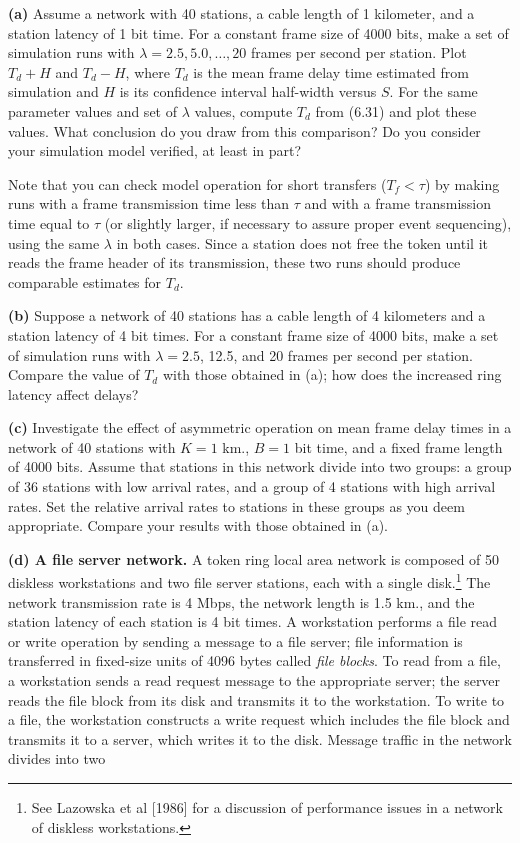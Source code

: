 \noindent\textbf{(a)} Assume a network with 40 stations, a cable length of 1 kilometer, and a station latency of 1 bit time. For a constant frame size of 4000 bits, make a set of simulation runs with $\lambda=2.5,5.0,\ldots,20$ frames per second per station. Plot $T_d+H$ and $T_d-H$, where $T_d$ is the mean frame delay time estimated from simulation and $H$ is its confidence interval half-width versus $S$. For the same parameter values and set of $\lambda$ values, compute $T_d$ from (6.31) and plot these values. What conclusion do you draw from this comparison? Do you consider your simulation model verified, at least in part?

Note that you can check model operation for short transfers ($T_f<\tau$) by making runs with a frame transmission time less than $\tau$ and with a frame transmission time equal to $\tau$ (or slightly larger, if necessary to assure proper event sequencing), using the same $\lambda$ in both cases. Since a station does not free the token until it reads the frame header of its transmission, these two runs should produce comparable estimates for $T_d$.

\noindent\textbf{(b)} Suppose a network of 40 stations has a cable length of 4 kilometers and a station latency of 4 bit times. For a constant frame size of 4000 bits, make a set of simulation runs with $\lambda=2.5$, 12.5, and 20 frames per second per station. Compare the value of $T_d$ with those obtained in (a); how does the increased ring latency affect delays?

\noindent\textbf{(c)} Investigate the effect of asymmetric operation on mean frame delay times in a network of 40 stations with $K=1$ km., $B=1$ bit time, and a fixed frame length of 4000 bits. Assume that stations in this network divide into two groups: a group of 36 stations with low arrival rates, and a group of 4 stations with high arrival rates. Set the relative arrival rates to stations in these groups as you deem appropriate. Compare your results with those obtained in (a).

\noindent\textbf{(d) A file server network.} A token ring local area network is composed of 50 diskless workstations and two file server stations, each with a single disk.\footnote{See Lazowska et al [1986] for a discussion of performance issues in a network of diskless workstations.} The network transmission rate is 4 Mbps, the network length is 1.5 km., and the station latency of each station is 4 bit times. A workstation performs a file read or write operation by sending a message to a file server; file information is transferred in fixed-size units of 4096 bytes called \emph{file blocks}. To read from a file, a workstation sends a read request message to the appropriate server; the server reads the file block from its disk and transmits it to the workstation. To write to a file, the workstation constructs a write request which includes the file block and transmits it to a server, which writes it to the disk. Message traffic in the network divides into two

